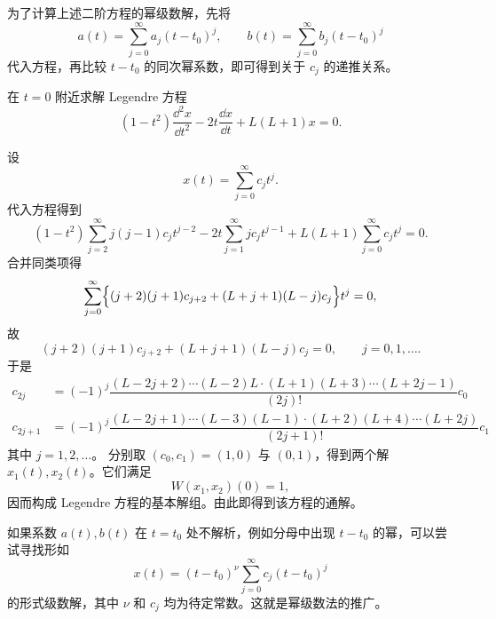 为了计算上述二阶方程的幂级数解，先将
\[
	a(t)=\sum_{j=0}^{\infty}a_j(t-t_0)^j,
	\qquad
	b(t)=\sum_{j=0}^{\infty}b_j(t-t_0)^j
\]
代入方程，再比较 $t-t_0$ 的同次幂系数，即可得到关于 $c_j$ 的递推关系。

\begin{example}\label{ex:Legendre方程的幂级数解}
	在 $t=0$ 附近求解 Legendre 方程
	\[
		(1-t^2)\dfrac{\dd^2x}{\dd t^2}
		-2t\dfrac{\dd x}{\dd t}+L(L+1)x=0.
	\]

	\begin{solution}
		设
		\[
			x(t)=\sum_{j=0}^{\infty}c_jt^j.
		\]
		代入方程得到
		\[
			(1-t^2)\sum_{j=2}^{\infty}j(j-1)c_jt^{j-2}
			-2t\sum_{j=1}^{\infty}jc_jt^{j-1}
			+L(L+1)\sum_{j=0}^{\infty}c_jt^j=0.
		\]
		合并同类项得
		\[
			\sum_{j=0}^{\infty}
			\Bigl\{(j+2)(j+1)c_{j+2}
			+(L+j+1)(L-j)c_j\Bigr\}t^j=0,
		\]
		故
		\[
			(j+2)(j+1)c_{j+2}
			+(L+j+1)(L-j)c_j=0,
			\qquad j=0,1,\ldots.
		\]
		于是
		\[
		\begin{aligned}
			c_{2j}
			&=(-1)^j
			\dfrac{(L-2j+2)\cdots(L-2)L\cdot(L+1)(L+3)\cdots(L+2j-1)}{(2j)!}c_0\\
			c_{2j+1}
			&=(-1)^j
			\dfrac{(L-2j+1)\cdots(L-3)(L-1)\cdot(L+2)(L+4)\cdots(L+2j)}{(2j+1)!}c_1
		\end{aligned}
		\]
		其中 $j=1,2,\ldots$。
		分别取 $(c_0,c_1)=(1,0)$ 与 $(0,1)$，得到两个解
		$x_1(t),x_2(t)$。它们满足
		\[
			W(x_1,x_2)(0)=1,
		\]
		因而构成 Legendre 方程的基本解组。由此即得到该方程的通解。
	\end{solution}
\end{example}

如果系数 $a(t),b(t)$ 在 $t=t_0$ 处不解析，例如分母中出现
$t-t_0$ 的幂，可以尝试寻找形如
\[
	x(t)=(t-t_0)^{\nu}\sum_{j=0}^{\infty}c_j(t-t_0)^j
\]
的形式级数解，其中 $\nu$ 和 $c_j$ 均为待定常数。这就是幂级数法的推广。

